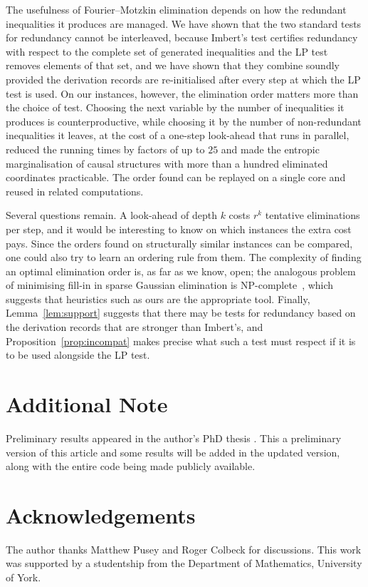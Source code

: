 \documentclass[11pt]{article}
\theoremstyle{definition}
\begin{document}
The usefulness of Fourier--Motzkin elimination depends on how the redundant inequalities it produces are managed. We have shown that the two standard tests for redundancy cannot be interleaved, because Imbert's test certifies redundancy with respect to the complete set of generated inequalities and the LP test removes elements of that set, and we have shown that they combine soundly provided the derivation records are re-initialised after every step at which the LP test is used. On our instances, however, the elimination order matters more than the choice of test. Choosing the next variable by the number of inequalities it produces is counterproductive, while choosing it by the number of non-redundant inequalities it leaves, at the cost of a one-step look-ahead that runs in parallel, reduced the running times by factors of up to $25$ and made the entropic marginalisation of causal structures with more than a hundred eliminated coordinates practicable. The order found can be replayed on a single core and reused in related computations.

Several questions remain. A look-ahead of depth $k$ costs $r^{k}$ tentative eliminations per step, and it would be interesting to know on which instances the extra cost pays. Since the orders found on structurally similar instances can be compared, one could also try to learn an ordering rule from them. The complexity of finding an optimal elimination order is, as far as we know, open; the analogous problem of minimising fill-in in sparse Gaussian elimination is NP-complete~\cite{yannakakis1981}, which suggests that heuristics such as ours are the appropriate tool. Finally, Lemma~\ref{lem:support} suggests that there may be tests for redundancy based on the derivation records that are stronger than Imbert's, and Proposition~\ref{prop:incompat} makes precise what such a test must respect if it is to be used alongside the LP test.

\section*{Additional Note}
Preliminary results appeared in the author's PhD thesis \cite{khanna2025exploring}. This a preliminary version of this article and some results will be added in the updated version, along with the entire code being made publicly available.

\section*{Acknowledgements}
The author thanks Matthew Pusey and Roger Colbeck for discussions. This work was supported by a studentship from the Department of Mathematics, University of York.
\end{document}
